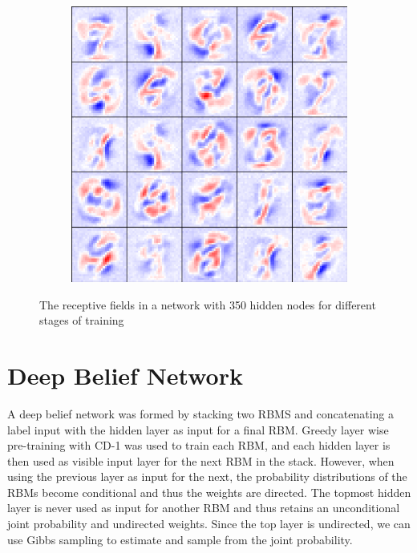 \documentclass[a4paper]{article}
\begin{document}
\begin{figure}[ht]
\begin{subfigure}[b]{0.3\textwidth}
  \end{subfigure}
  \begin{subfigure}[b]{0.3\textwidth}
   \centering
   \includegraphics[width=\linewidth]{figures/rf350.iter030000.png}
   \end{subfigure}
   \caption{The receptive fields in a network with 350 hidden nodes for different stages of training}
   \label{fig:receptive}
\end{figure}
\section{Deep Belief Network}
A deep belief network was formed by stacking two RBMS and concatenating a label input with the hidden layer as input for a final RBM. Greedy layer wise pre-training with CD-1 was used to train each RBM, and each hidden layer is then used as visible input layer for the next RBM in the stack. However, when using the previous layer as input for the next, the probability distributions of the RBMs become conditional and thus the weights are directed. The topmost hidden layer is never used as input for another RBM and thus retains an unconditional joint probability and undirected weights. Since the top layer is undirected, we can use Gibbs sampling to estimate and sample from the joint probability.
\end{document}
